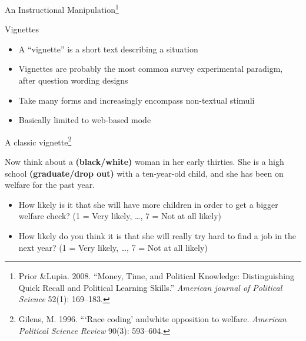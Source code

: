 \documentclass[
  ignorenonframetext,
]{beamer}
\begin{document}
\begin{frame}{An Instructional
Manipulation\footnote{Prior \&Lupia. 2008. ``Money, Time, and Political Knowledge: Distinguishing Quick Recall and Political Learning Skills.'' \textit{American journal of Political Science} 52(1): 169--183.}}
\protect\hypertarget{an-instructional-manipulation-1}{}
\small

\end{frame}

\begin{frame}{Vignettes}
\protect\hypertarget{vignettes}{}
\begin{itemize}
\item A ``vignette'' is a short text describing a situation
\item Vignettes are probably the most common survey experimental paradigm, after question wording designs
\item Take many forms and increasingly encompass non-textual stimuli
\item Basically limited to web-based mode
\end{itemize}
\end{frame}

\begin{frame}{A classic
vignette\footnote{Gilens, M. 1996. ```Race coding' andwhite opposition to welfare. \textit{American Political Science Review} 90(3): 593--604.}}
\protect\hypertarget{a-classic-vignette}{}
\small

Now think about a \textbf{(black/white)} woman in her early thirties.
She is a high school \textbf{(graduate/drop out)} with a ten-year-old
child, and she has been on welfare for the past year.

\begin{itemize}\footnotesize
\item How likely is it that she will have more children in order to get a bigger welfare check? (1 = Very likely, \dots, 7 = Not at all likely)
\item How likely do you think it is that she will really try hard to find a job in the next year? (1 = Very likely, \dots, 7 = Not at all likely)
\end{itemize}
\end{frame}
\end{document}
